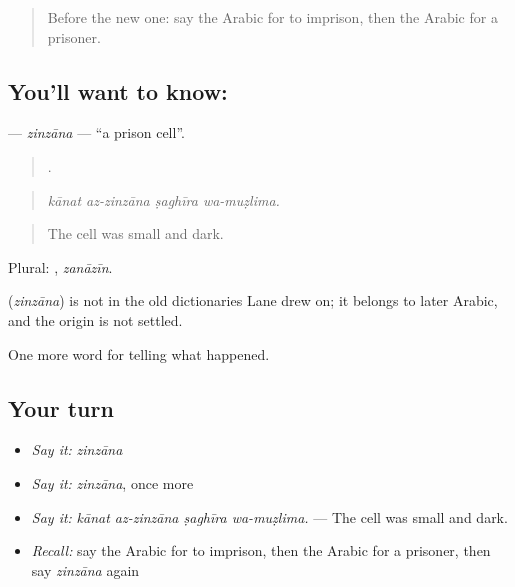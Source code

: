\label{lesson:AR-C330-zinzana}



\begin{quote}
Before the new one: say the Arabic for to imprison, then the Arabic for a prisoner.
\end{quote}

\subsection*{You'll want to know: }
\textbf{} — \emph{zinzāna} — \textquotedblleft{}a prison cell\textquotedblright{}.

\begin{quote}
   .
\end{quote}

\begin{quote}
\emph{kānat az-zinzāna ṣaghīra wa-muẓlima.}
\end{quote}

\begin{quote}
The cell was small and dark.
\end{quote}

Plural: , \emph{zanāzīn}.

\begin{cousinweb}
\textbf{} (\emph{zinzāna}) is not in the old dictionaries Lane drew on; it belongs to later Arabic, and the origin is not settled.
\end{cousinweb}

\begin{grammarlens}[title={What you've built}]
One more word for telling what happened.
\end{grammarlens}

\subsection*{Your turn}
\begin{itemize}
\raggedright
  \item \emph{Say it:} \emph{zinzāna}
  \item \emph{Say it:} \emph{zinzāna}, once more
  \item \emph{Say it:} \emph{kānat az-zinzāna ṣaghīra wa-muẓlima.} — The cell was small and dark.
  \item \emph{Recall:} say the Arabic for to imprison, then the Arabic for a prisoner, then say \emph{zinzāna} again
\end{itemize}

